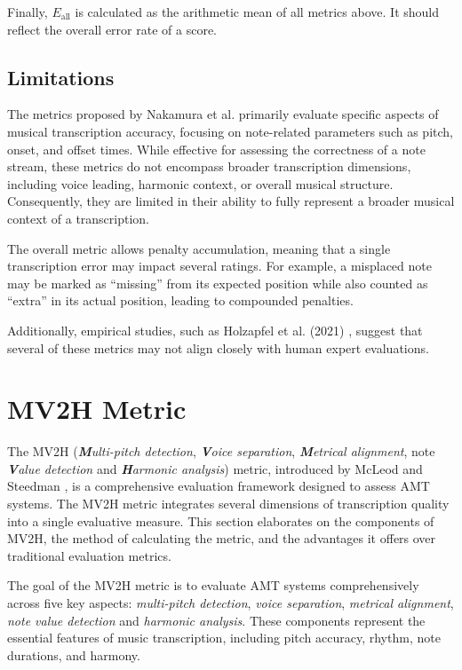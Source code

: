 Finally, $E_{\textrm{all}}$ is calculated as the arithmetic mean of all metrics above. It should reflect the overall error rate of a score.

\subsection{Limitations}

The metrics proposed by Nakamura et al. primarily evaluate specific aspects of musical transcription accuracy, focusing on note-related parameters such as pitch, onset, and offset times. While effective for assessing the correctness of a note stream, these metrics do not encompass broader transcription dimensions, including voice leading, harmonic context, or overall musical structure. Consequently, they are limited in their ability to fully represent a broader musical context of a transcription.

The overall metric allows penalty accumulation, meaning that a single transcription error may impact several ratings. For example, a misplaced note may be marked as ``missing'' from its expected position while also counted as ``extra'' in its actual position, leading to compounded penalties.

Additionally, empirical studies, such as Holzapfel et al. (2021) \cite{Holzapfel2021}, suggest that several of these metrics may not align closely with human expert evaluations. 

\section{MV2H Metric} \label{MV2H_section}

The MV2H (\emph{\textbf{M}ulti-pitch detection}, \emph{\textbf{V}oice separation}, \emph{\textbf{M}etrical alignment}, note \emph{\textbf{V}alue detection} and \emph{\textbf{H}armonic analysis}) metric, introduced by McLeod and Steedman \cite{McLeod2018}, is a comprehensive evaluation framework designed to assess AMT systems. The MV2H metric integrates several dimensions of transcription quality into a single evaluative measure. This section elaborates on the components of MV2H, the method of calculating the metric, and the advantages it offers over traditional evaluation metrics.

The goal of the MV2H metric is to evaluate AMT systems comprehensively across five key aspects: \emph{multi-pitch detection}, \emph{voice separation}, \emph{metrical alignment}, \emph{note value detection} and \emph{harmonic analysis}. These components represent the essential features of music transcription, including pitch accuracy, rhythm, note durations, and harmony. 

